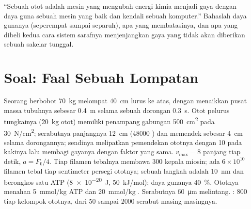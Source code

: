\begin{exercise}[$\star\star\star$]\label{exo:b2:muscle-movement:12}
``Sebuah otot adalah mesin yang mengubah energi kimia menjadi gaya
dengan daya guna sebuah mesin yang baik dan kendali sebuah komputer.''
Bahaslah daya gunanya (seperempat sampai separuh), apa yang
membatasinya, dan apa yang dibeli kedua cara sistem sarafnya
menjenjangkan gaya yang tidak akan diberikan sebuah sakelar tunggal.
\end{exercise}

\section{Soal: Faal Sebuah Lompatan}

\begin{problem}
\label{pb:b2:muscle-movement:1}
Seorang berbobot \qty{70}{kg} melompat \qty{40}{cm} lurus ke atas,
dengan menaikkan pusat massa tubuhnya sebesar \qty{0.4}{m} selama
sebuah dorongan \qty{0.3}{s}. Otot pelurus tungkainya (\qty{20}{kg}
otot) memiliki penampang gabungan \qty{500}{cm^2} pada
\qty{30}{N/cm^2}; serabutnya panjangnya \qty{12}{cm} (\num{48000}
) dan memendek sebesar \qty{4}{cm} selama dorongannya;
sendinya melipatkan pemendekan ototnya dengan \num{10} pada kakinya lalu
membagi gayanya dengan faktor yang sama. $v_{\max} = 8$ panjang tiap
detik, $a = F_0/4$. Tiap filamen tebalnya membawa \num{300} kepala
miosin; ada $6\times
10^{10}$ filamen tebal tiap sentimeter persegi
ototnya; sebuah langkah adalah \qty{10}{nm} dan berongkos satu ATP
(\qty{8e-20}{J}, \qty{50}{kJ/mol}); daya gunanya \qty{40}{\%}. Ototnya
menahan \qty{5}{mmol/kg} ATP dan \qty{20}{mmol/kg} .
Serabutnya \qty{60}{\micro m} melintang. : \num{800}
tiap kelompok ototnya, dari \num{50} sampai \num{2000} serabut
masing-masingnya.


\end{problem}
